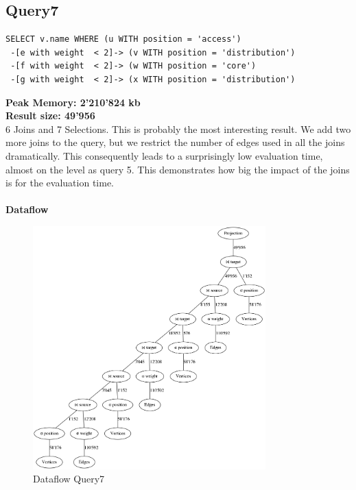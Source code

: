 \documentclass[11pt,singlecolumn]{scrartcl}
\begin{document}
\subsection{Query7}
\begin{verbatim}
SELECT v.name WHERE (u WITH position = 'access')
 -[e with weight  < 2]-> (v WITH position = 'distribution')
 -[f with weight  < 2]-> (w WITH position = 'core')
 -[g with weight  < 2]-> (x WITH position = 'distribution')\end{verbatim}
\textbf{Peak Memory: 2'210'824 kb}\\
\textbf{Result size: 49'956}\\
6 Joins and 7 Selections. This is probably the most interesting result. We add two more joins to the query, but we restrict the number of edges used in all the joins dramatically. This consequently leads to a surprisingly low evaluation time, almost on the level as query 5. This demonstrates how big the impact of the joins is for the evaluation time.\\\\
\textbf{Dataflow}
\begin{figure}[H]
\includegraphics[width=0.8\textwidth]{graph7}
\caption{Dataflow Query7}
\end{figure}
\clearpage
\end{document}
